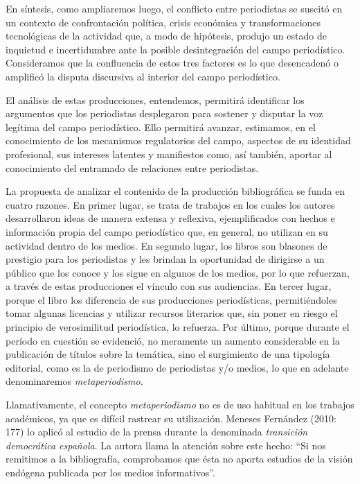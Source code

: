 En síntesis, como ampliaremos luego, el conflicto entre periodistas se suscitó en un contexto de confrontación política, crisis económica y transformaciones tecnológicas de la actividad que, a modo de hipótesis, produjo un estado de inquietud e incertidumbre ante la posible desintegración del campo periodístico. Consideramos que la confluencia de estos tres factores es lo que desencadenó o amplificó la disputa discursiva al interior del campo periodístico.

El análisis de estas producciones, entendemos, permitirá identificar los argumentos que los periodistas desplegaron para sostener y disputar la voz legítima del campo periodístico. Ello permitirá avanzar, estimamos, en el conocimiento de los mecanismos regulatorios del campo, aspectos de su identidad profesional, sus intereses latentes y manifiestos como, así también, aportar al conocimiento del entramado de relaciones entre periodistas.

La propuesta de analizar el contenido de la producción bibliográfica se funda en cuatro razones. En primer lugar, se trata de trabajos en los cuales los autores desarrollaron ideas de manera extensa y reflexiva, ejemplificados con hechos e información propia del campo periodístico que, en general, no utilizan en su actividad dentro de los medios. En segundo lugar, los libros son blasones de prestigio para los periodistas y les brindan la oportunidad de dirigirse a un público que los conoce y los sigue en algunos de los medios, por lo que refuerzan, a través de estas producciones el vínculo con sus audiencias. En tercer lugar, porque el libro los diferencia de sus producciones periodísticas, permitiéndoles tomar algunas licencias y utilizar recursos literarios que, sin poner en riesgo el principio de verosimilitud periodística, lo refuerza. Por último, porque durante el período en cuestión se evidenció, no meramente un aumento considerable en la publicación de títulos sobre la temática, sino el surgimiento de una tipología editorial, como es la de periodismo de periodistas y/o medios, lo que en adelante denominaremos \emph{metaperiodismo}.

Llamativamente, el concepto \emph{metaperiodismo} no es de uso habitual en los trabajos académicos, ya que es difícil rastrear su utilización. Meneses Fernández (2010: 177) lo aplicó al estudio de la prensa durante la denominada \emph{transición democrática española}. La autora llama la atención sobre este hecho: ``Si nos remitimos a la bibliografía, comprobamos que ésta no aporta estudios de la visión endógena publicada por los medios informativos''.

